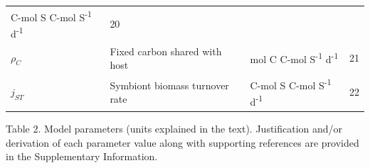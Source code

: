\documentclass[]{elsarticle} %
\begin{document}
\begin{longtable}[c]{@{}llll@{}}
\begin{minipage}[t]{0.27\columnwidth}\raggedright\strut
C-mol S C-mol S\textsuperscript{-1} d\textsuperscript{-1}
\strut\end{minipage} &
\begin{minipage}[t]{0.10\columnwidth}\raggedright\strut
20
\strut\end{minipage}\tabularnewline
\begin{minipage}[t]{0.10\columnwidth}\raggedright\strut
\(\rho_C\)
\strut\end{minipage} &
\begin{minipage}[t]{0.45\columnwidth}\raggedright\strut
Fixed carbon shared with host
\strut\end{minipage} &
\begin{minipage}[t]{0.27\columnwidth}\raggedright\strut
mol C C-mol S\textsuperscript{-1} d\textsuperscript{-1}
\strut\end{minipage} &
\begin{minipage}[t]{0.10\columnwidth}\raggedright\strut
21
\strut\end{minipage}\tabularnewline
\begin{minipage}[t]{0.10\columnwidth}\raggedright\strut
\(j_{ST}\)
\strut\end{minipage} &
\begin{minipage}[t]{0.45\columnwidth}\raggedright\strut
Symbiont biomass turnover rate
\strut\end{minipage} &
\begin{minipage}[t]{0.27\columnwidth}\raggedright\strut
C-mol S C-mol S\textsuperscript{-1} d\textsuperscript{-1}
\strut\end{minipage} &
\begin{minipage}[t]{0.10\columnwidth}\raggedright\strut
22
\strut\end{minipage}\tabularnewline
\bottomrule
\end{longtable}

Table 2. Model parameters (units explained in the text). Justification
and/or derivation of each parameter value along with supporting
references are provided in the Supplementary Information.
\end{document}
